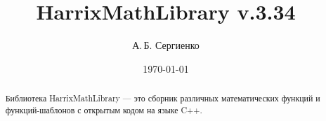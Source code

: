 \documentclass[a4paper,12pt]{article}
\title{HarrixMathLibrary v.3.34}
\author{А.\,Б. Сергиенко}
\date{\today}
\begin{document}


\maketitle

\begin{abstract}
Библиотека HarrixMathLibrary --- это сборник различных математических функций и функций-шаблонов с открытым кодом на языке C++.
\end{abstract}

\tableofcontents
\end{document}
